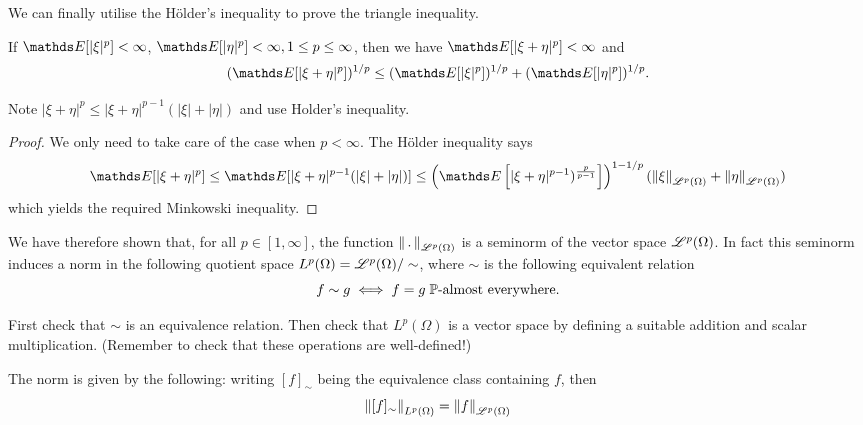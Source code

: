 We can finally utilise the Hölder's inequality to prove the triangle inequality.

\begin{proposition}
If $\E[|\xi|^p] < \infty$, $\E[|\eta|^p] < \infty, 1\le p \le \infty$, then we have $\E[|\xi + \eta|^p]<\infty$ and 
\begin{equation*}
    (\E[|\xi + \eta|^p])^{1/p} \le (\E[|\xi|^p])^{1/p} + (\E[|\eta|^p])^{1/p}.
\end{equation*}
\end{proposition}

\begin{hint}
Note $|\xi + \eta|^p \leq |\xi + \eta|^{p-1}(|\xi| + |\eta|)$ and use Holder's inequality.
\end{hint}

\begin{proof}
We only need to take care of the case when $p<\infty$. The Hölder inequality says
\begin{equation}
    \E[|\xi + \eta|^p] \leq \E[|\xi + \eta|^{p-1} (|\xi| + |\eta|)] \leq \left(\E\sqbracket{|\xi + \eta|^{p-1})^{\frac{p}{p-1}}}\right)^{1-1/p} (\norm{\xi}_{\L^p(\Omega)} + \norm{\eta}_{\L^p(\Omega)})
\end{equation}
which yields the required Minkowski inequality.
\end{proof}

We have therefore shown that, for all $p \in [1,\infty]$, the function $\left\| \,.\, \right\|_{\mathcal{L}^p(\Omega)}$ is a seminorm of the vector space $\mathcal{L}^p(\Omega)$. In fact this seminorm induces a norm in the following quotient space $L^p(\Omega) = \mathcal{L}^p(\Omega) / \sim$, where $\sim$ is the following equivalent relation
\begin{equation} \label{eq:equiv_relation_Lp}
    f \sim g \iff f = g \; \mathbb{P}\text{-almost everywhere.} 
\end{equation}

\begin{unexaminable}
\begin{exercise}
First check that $\sim$ is an equivalence relation. Then check that $L^p(\Omega)$ is a vector space by defining a suitable addition and scalar multiplication. (Remember to check that these operations are well-defined!)
\end{exercise}
\end{unexaminable}

The norm is given by the following: writing $[f]_\sim$ being the equivalence class containing $f$, then
\begin{equation}
    \left\| [f]_\sim \right\|_{L^p(\Omega)} = \left\| f \right\|_{\mathcal{L}^p(\Omega)}
\end{equation}

